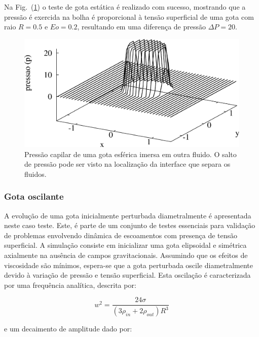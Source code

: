 \documentclass[a4paper,portuges,12pt]{article}
\begin{document}
Na Fig.~(\ref{fig:pressure3d}) o teste de gota estática é realizado com
sucesso, mostrando que a pressão é exercida na bolha é proporcional
à tensão superficial de uma gota com raio $R=0.5$ e $Eo=0.2$, resultando
em uma diferença de pressão $\Delta P = 20$.

 \begin{figure}[h]
 	\begin{center}
 		\includegraphics[angle=0, scale=0.5]{figs/pressure3d.pdf}
 	\end{center}
 	\caption{Pressão capilar de uma gota esférica imersa em outra fluido. 
	O salto de pressão pode ser visto na localização da interface que
	separa os fluidos.}
 	\label{fig:pressure3d} 
 \end{figure}

\subsubsection{Gota oscilante}

A evolução de uma gota inicialmente perturbada diametralmente é
apresentada neste caso teste. Este, é parte de um conjunto de testes
essenciais para validação de problemas envolvendo dinâmica de
escoamentos com presença de tensão superficial. A simulação consiste em
inicializar uma gota elipsoidal e simétrica axialmente na ausência de
campos gravitacionais. Assumindo que os efeitos de viscosidade são
mínimos, espera-se que a gota perturbada oscile diametralmente devido à
variação de pressão e tensão superficial. Esta oscilação é caracterizada
por uma frequência analítica, descrita por:

\begin{equation}
	w^2 = \frac{24\sigma}{(3\rho_{in}+2\rho_{out})R^3 }
\label{eq:frequency}
\end{equation}

\noindent e um decaimento de amplitude dado por:
\end{document}
